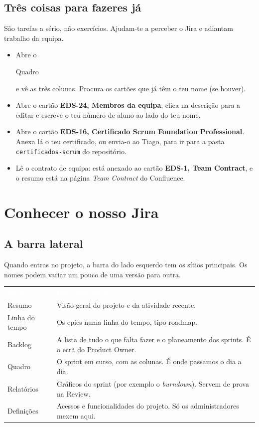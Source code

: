 \documentclass[11pt,a4paper]{article}
\newcommand{\th}[1]{\textcolor{white}{\sffamily\bfseries #1}}
\newcommand{\btn}[1]{{\setlength{\fboxsep}{1.6pt}\colorbox{azulclaro}{\sffamily\small\strut #1}}}
\newcommand{\tabelaini}{\begingroup\small\renewcommand{\arraystretch}{1.45}\rowcolors{2}{azulclaro!55}{white}}
\newcommand{\tabelafim}{\endgroup}
\begin{document}
\subsection{Três coisas para fazeres já}

São tarefas a sério, não exercícios. Ajudam-te a perceber o Jira e adiantam trabalho da equipa.

\begin{itemize}[label=\textcolor{azul}{$\square$}]
  \item Abre o \btn{Quadro} e vê as três colunas. Procura os cartões que já têm o teu nome (se houver).
  \item Abre o cartão \textbf{EDS-24, Membros da equipa}, clica na descrição para a editar e escreve o teu número de aluno ao lado do teu nome.
  \item Abre o cartão \textbf{EDS-16, Certificado Scrum Foundation Professional}. Anexa lá o teu certificado, ou envia-o ao Tiago, para ir para a pasta \texttt{certificados-scrum} do repositório.
  \item Lê o contrato de equipa: está anexado ao cartão \textbf{EDS-1, Team Contract}, e o resumo está na página \textit{Team Contract} do Confluence.
\end{itemize}

\section{Conhecer o nosso Jira}

\subsection{A barra lateral}

Quando entras no projeto, a barra do lado esquerdo tem os sítios principais. Os nomes podem variar um pouco de uma versão para outra.

\tabelaini
\begin{tabularx}{\textwidth}{N{3cm} Y}
   \th{Sítio} & \th{Para que serve} \\
  Resumo & Visão geral do projeto e da atividade recente. \\
  Linha do tempo & Os epics numa linha do tempo, tipo roadmap. \\
  Backlog & A lista de tudo o que falta fazer e o planeamento dos sprints. É o ecrã do Product Owner. \\
  Quadro & O sprint em curso, com as colunas. É onde passamos o dia a dia. \\
  Relatórios & Gráficos do sprint (por exemplo o \textit{burndown}). Servem de prova na Review. \\
  Definições & Acessos e funcionalidades do projeto. Só os administradores mexem aqui. \\
  \bottomrule
\end{tabularx}
\tabelafim
\end{document}
